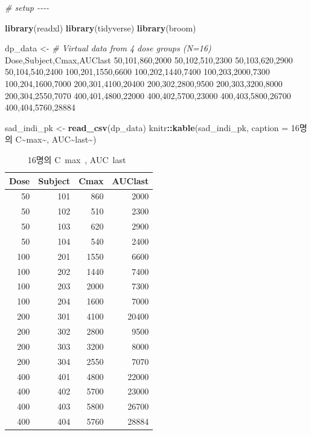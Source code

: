 \documentclass[
  12pt,
]{krantz}
\newenvironment{Shaded}{\begin{snugshade}}{\end{snugshade}}
\newcommand{\CommentTok}[1]{\textcolor[rgb]{0.56,0.35,0.01}{\textit{#1}}}
\newcommand{\DataTypeTok}[1]{\textcolor[rgb]{0.13,0.29,0.53}{#1}}
\newcommand{\KeywordTok}[1]{\textcolor[rgb]{0.13,0.29,0.53}{\textbf{#1}}}
\newcommand{\NormalTok}[1]{#1}
\newcommand{\OperatorTok}[1]{\textcolor[rgb]{0.81,0.36,0.00}{\textbf{#1}}}
\newcommand{\StringTok}[1]{\textcolor[rgb]{0.31,0.60,0.02}{#1}}
\begin{document}
\begin{Shaded}
\begin{Highlighting}[]
\CommentTok{\# setup {-}{-}{-}{-}}

\KeywordTok{library}\NormalTok{(readxl)}
\KeywordTok{library}\NormalTok{(tidyverse)}
\KeywordTok{library}\NormalTok{(broom)}

\NormalTok{dp\_data \textless{}{-}}\StringTok{ }\CommentTok{\# Virtual data from 4 dose groups (N=16)}
\StringTok{\textquotesingle{}Dose,Subject,Cmax,AUClast}
\StringTok{50,101,860,2000}
\StringTok{50,102,510,2300}
\StringTok{50,103,620,2900}
\StringTok{50,104,540,2400}
\StringTok{100,201,1550,6600}
\StringTok{100,202,1440,7400}
\StringTok{100,203,2000,7300}
\StringTok{100,204,1600,7000}
\StringTok{200,301,4100,20400}
\StringTok{200,302,2800,9500}
\StringTok{200,303,3200,8000}
\StringTok{200,304,2550,7070}
\StringTok{400,401,4800,22000}
\StringTok{400,402,5700,23000}
\StringTok{400,403,5800,26700}
\StringTok{400,404,5760,28884\textquotesingle{}}

\NormalTok{sad\_indi\_pk \textless{}{-}}\StringTok{ }\KeywordTok{read\_csv}\NormalTok{(dp\_data)}
\NormalTok{knitr}\OperatorTok{::}\KeywordTok{kable}\NormalTok{(sad\_indi\_pk, }\DataTypeTok{caption =} \StringTok{\textquotesingle{}16명의 C\textasciitilde{}max\textasciitilde{}, AUC\textasciitilde{}last\textasciitilde{}\textquotesingle{}}\NormalTok{)}
\end{Highlighting}
\end{Shaded}

\begin{table}

\caption{\label{tab:sad-pk}16명의 C~max~, AUC~last~}
\centering
\begin{tabular}[t]{r|r|r|r}
\hline
Dose & Subject & Cmax & AUClast\\
\hline
50 & 101 & 860 & 2000\\
\hline
50 & 102 & 510 & 2300\\
\hline
50 & 103 & 620 & 2900\\
\hline
50 & 104 & 540 & 2400\\
\hline
100 & 201 & 1550 & 6600\\
\hline
100 & 202 & 1440 & 7400\\
\hline
100 & 203 & 2000 & 7300\\
\hline
100 & 204 & 1600 & 7000\\
\hline
200 & 301 & 4100 & 20400\\
\hline
200 & 302 & 2800 & 9500\\
\hline
200 & 303 & 3200 & 8000\\
\hline
200 & 304 & 2550 & 7070\\
\hline
400 & 401 & 4800 & 22000\\
\hline
400 & 402 & 5700 & 23000\\
\hline
400 & 403 & 5800 & 26700\\
\hline
400 & 404 & 5760 & 28884\\
\hline
\end{tabular}
\end{table}
\end{document}
